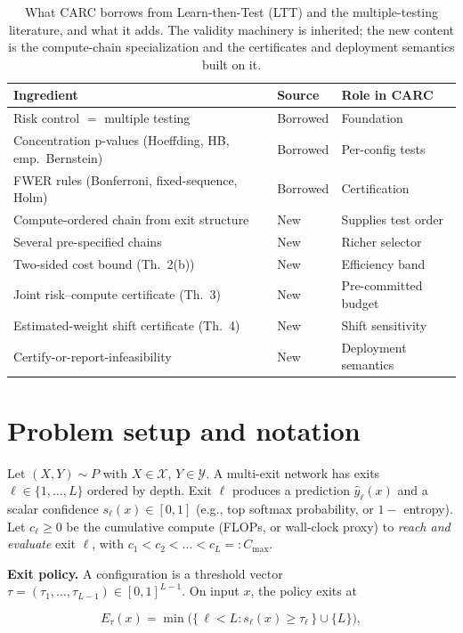 \documentclass{ieeeaccess}
\begin{document}
\begin{table}[t]
\centering
\caption{What CARC borrows from Learn-then-Test (LTT) and the multiple-testing literature, and what it adds. The validity machinery is inherited; the new content is the compute-chain specialization and the certificates and deployment semantics built on it.}
\label{tab:ltt-delta}
\scriptsize
\setlength{\tabcolsep}{4pt}
\begin{tabular}{@{}p{4.0cm}lp{2.3cm}@{}}
\toprule
Ingredient & Source & Role in CARC \\
\midrule
Risk control $=$ multiple testing & Borrowed & Foundation \\
Concentration p-values (Hoeffding, HB, emp.\ Bernstein) & Borrowed & Per-config tests \\
FWER rules (Bonferroni, fixed-sequence, Holm) & Borrowed & Certification \\
Compute-ordered chain from exit structure & New & Supplies test order \\
Several pre-specified chains & New & Richer selector \\
Two-sided cost bound (Th.~2(b)) & New & Efficiency band \\
Joint risk--compute certificate (Th.~3) & New & Pre-committed budget \\
Estimated-weight shift certificate (Th.~4) & New & Shift sensitivity \\
Certify-or-report-infeasibility & New & Deployment semantics \\
\bottomrule
\end{tabular}
\end{table}

\section{Problem setup and notation}

Let $(X,Y)\sim P$ with $X\in\mathcal X$, $Y\in\mathcal Y$. A multi-exit network has exits $\ell\in\{1,\dots,L\}$ ordered by depth. Exit $\ell$ produces a prediction $\hat y_\ell(x)$ and a scalar confidence $s_\ell(x)\in[0,1]$ (e.g., top softmax probability, or $1-$ entropy). Let $c_\ell\ge0$ be the cumulative compute (FLOPs, or wall-clock proxy) to \emph{reach and evaluate} exit $\ell$, with $c_1<c_2<\dots<c_L=:C_{\max}$.

\textbf{Exit policy.} A configuration is a threshold vector $\tau=(\tau_1,\dots,\tau_{L-1})\in[0,1]^{L-1}$. On input $x$, the policy exits at

\[
E_\tau(x)=\min\big(\{\,\ell<L : s_\ell(x)\ge\tau_\ell\,\}\cup\{L\}\big),
\]
\end{document}
